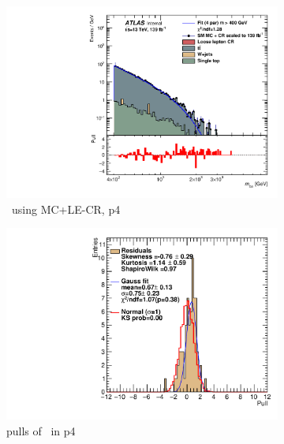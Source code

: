 \newpage

\begin{figure}[ht]
    \centering
    \begin{subfigure}[h]{0.38\linewidth}
    \includegraphics[scale=0.3]{figs/ch6/fit/variable_nosmooth/p4/1PB/output_SMMCplusCR_Mbm_p4.pdf}%
    \caption{\mbmu \ using MC+LE-CR, p4}
    \end{subfigure}
    \hfill
    \begin{subfigure}[h]{0.4\linewidth}
    \includegraphics[scale=0.32]{figs/ch6/fit/variable_nosmooth/p4/1PB/pull_SMMCplusCR_Mbm_p4.pdf}%
    \caption{pulls of \mbmu \ in p4}
    \end{subfigure}
    \hfill
    \begin{subfigure}[h]{0.38\linewidth}

\end{subfigure}
\end{figure}
